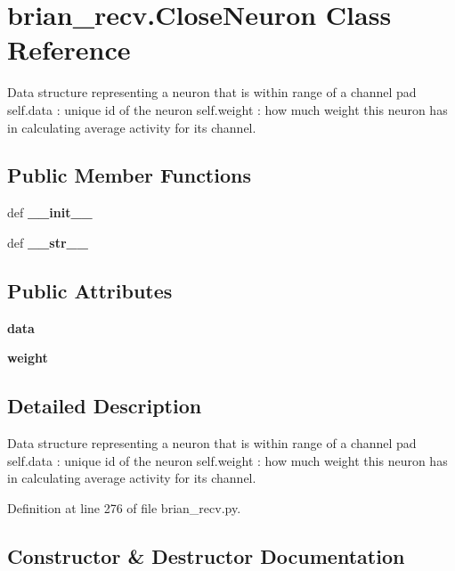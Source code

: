 \section{brian\-\_\-recv.\-Close\-Neuron \-Class \-Reference}
\label{classbrian__recv_1_1CloseNeuron}


\-Data structure representing a neuron that is within range of a channel pad self.\-data \-: unique id of the neuron self.\-weight \-: how much weight this neuron has in calculating average activity for its channel.  


\subsection*{\-Public \-Member \-Functions}
\begin{DoxyCompactItemize}
\item 
def {\bf \-\_\-\-\_\-init\-\_\-\-\_\-}
\item 
def {\bf \-\_\-\-\_\-str\-\_\-\-\_\-}
\end{DoxyCompactItemize}
\subsection*{\-Public \-Attributes}
\begin{DoxyCompactItemize}
\item 
{\bf data}
\item 
{\bf weight}
\end{DoxyCompactItemize}


\subsection{\-Detailed \-Description}
\-Data structure representing a neuron that is within range of a channel pad self.\-data \-: unique id of the neuron self.\-weight \-: how much weight this neuron has in calculating average activity for its channel. 

\-Definition at line 276 of file brian\-\_\-recv.\-py.



\subsection{\-Constructor \& \-Destructor \-Documentation}
